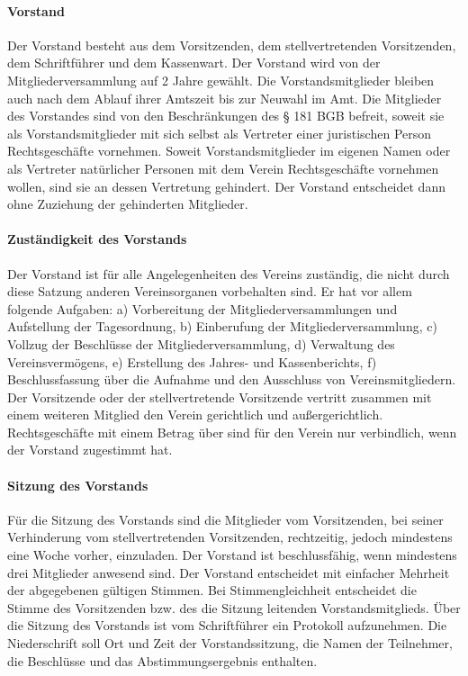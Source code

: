 \begin{multicols}{2}
\paragraph{Vorstand}
Der Vorstand besteht aus dem Vorsitzenden, dem stellvertretenden
Vorsitzenden, dem Schriftführer und dem Kassenwart. Der Vorstand wird
von der Mitgliederversammlung auf 2 Jahre gewählt. Die
Vorstandsmitglieder bleiben auch nach dem Ablauf ihrer Amtszeit bis zur
Neuwahl im Amt. Die Mitglieder des Vorstandes sind von den
Beschränkungen des § 181 BGB befreit, soweit sie als Vorstandsmitglieder
mit sich selbst als Vertreter einer juristischen Person Rechtsgeschäfte
vornehmen. Soweit Vorstandsmitglieder im eigenen Namen oder als
Vertreter natürlicher Personen mit dem Verein Rechtsgeschäfte vornehmen
wollen, sind sie an dessen Vertretung gehindert. Der Vorstand entscheidet
dann ohne Zuziehung der gehinderten Mitglieder.
\paragraph{Zuständigkeit des Vorstands}
Der Vorstand ist für alle Angelegenheiten des Vereins zuständig, die nicht
durch diese Satzung anderen Vereinsorganen vorbehalten sind.
Er hat vor allem folgende Aufgaben:
a) Vorbereitung der Mitgliederversammlungen und Aufstellung der
Tagesordnung,
b) Einberufung der Mitgliederversammlung,
c) Vollzug der Beschlüsse der Mitgliederversammlung,
d) Verwaltung des Vereinsvermögens,
e) Erstellung des Jahres- und Kassenberichts,
f) Beschlussfassung über die Aufnahme und den Ausschluss von
Vereinsmitgliedern.
Der Vorsitzende oder der stellvertretende Vorsitzende vertritt zusammen
mit einem weiteren Mitglied den Verein gerichtlich und außergerichtlich.
Rechtsgeschäfte mit einem Betrag über   sind für den Verein nur
verbindlich, wenn der Vorstand zugestimmt hat.

\paragraph{Sitzung des Vorstands}
Für die Sitzung des Vorstands sind die Mitglieder vom Vorsitzenden, bei
seiner Verhinderung vom stellvertretenden Vorsitzenden, rechtzeitig, jedoch
mindestens eine Woche vorher, einzuladen. Der Vorstand ist
beschlussfähig, wenn mindestens drei Mitglieder anwesend sind. Der
Vorstand entscheidet mit einfacher Mehrheit der abgegebenen gültigen
Stimmen. Bei Stimmengleichheit entscheidet die Stimme des Vorsitzenden
bzw. des die Sitzung leitenden Vorstandsmitglieds. Über die Sitzung des
Vorstands ist vom Schriftführer ein Protokoll aufzunehmen. Die
Niederschrift soll Ort und Zeit der Vorstandssitzung, die Namen der
Teilnehmer, die Beschlüsse und das Abstimmungsergebnis enthalten.


\end{multicols}
